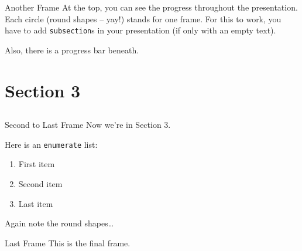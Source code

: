 \begin{frame}{Another Frame}
    At the top, you can see the progress throughout the presentation.
    Each circle (round shapes -- yay!) stands for one frame.
    For this to work, you have to add \texttt{subsection}s in your presentation
    (if only with an empty text).
    
    Also, there is a progress bar beneath.
\end{frame}




\section{Section 3}
\subsection*{}

\begin{frame}{Second to Last Frame}
    Now we're in Section 3.

    Here is an \texttt{enumerate} list:
    \begin{enumerate}
        \item
        First item

        \item
        Second item

        \item
        Last item
    \end{enumerate}
    Again note the round shapes\dots
\end{frame}

\begin{frame}{Last Frame}
    This is the final frame.
\end{frame}



\thanksframe
